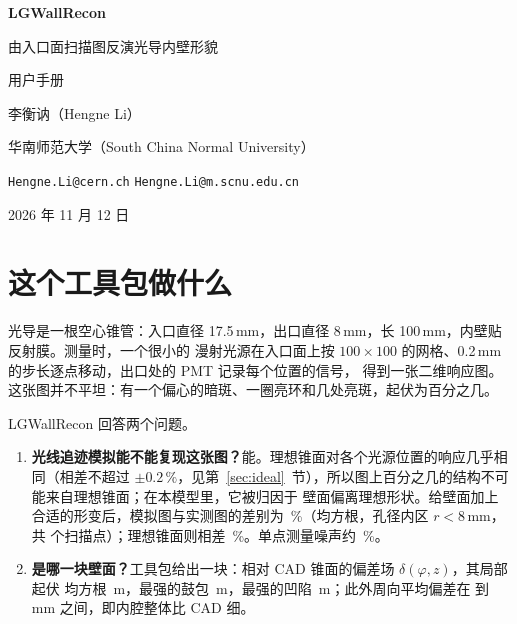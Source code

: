 \documentclass[11pt,a4paper,fontset=fandol]{ctexart}
\newcommand{\um}{\,\textmu m}
\newcommand{\code}[1]{\texttt{#1}}
\begin{document}
\begin{titlepage}
\vspace*{2.5cm}
{\Huge\bfseries LGWallRecon\par}
\vspace{0.5cm}
{\LARGE 由入口面扫描图反演光导内壁形貌\par}
\vspace{0.9cm}
{\Large 用户手册\par}
\vspace{2.2cm}
{\large 李衡讷（Hengne Li）\par}
\vspace{4pt}
华南师范大学（South China Normal University）\par
\vspace{4pt}
\code{Hengne.Li@cern.ch} \quad \code{Hengne.Li@m.scnu.edu.cn}\par
\vspace{1.2cm}
2026 年 11 月 12 日\par
\vfill
{}
\end{titlepage}

\tableofcontents
\newpage

\section{这个工具包做什么}

光导是一根空心锥管：入口直径 17.5\,mm，出口直径 8\,mm，长 100\,mm，内壁贴反射膜。测量时，一个很小的
漫射光源在入口面上按 $100\times100$ 的网格、0.2\,mm 的步长逐点移动，出口处的 PMT 记录每个位置的信号，
得到一张二维响应图。这张图并不平坦：有一个偏心的暗斑、一圈亮环和几处亮斑，起伏为百分之几。

LGWallRecon 回答两个问题。

\begin{enumerate}
\item \textbf{光线追迹模拟能不能复现这张图？}能。理想锥面对各个光源位置的响应几乎相同（相差不超过
$\pm0.2\,\%$，见第~\ref{sec:ideal}~节），所以图上百分之几的结构不可能来自理想锥面；在本模型里，它被归因于
壁面偏离理想形状。给壁面加上合适的形变后，模拟图与实测图的差别为 \RmsFit\,\%（均方根，孔径内区
$r<8$\,mm，共 \Npts{} 个扫描点）；理想锥面则相差 \RmsIdeal\,\%。单点测量噪声约 \NoisePct\,\%。
\item \textbf{是哪一块壁面？}工具包给出一块：相对 CAD 锥面的偏差场 $\delta(\varphi,z)$，其局部起伏
均方根 \LocRms\um，最强的鼓包 \LocMin\um，最强的凹陷 \LocMax\um；此外周向平均偏差在 \MeanMax{} 到 \MeanMin\,mm 之间，即内腔整体比 CAD 细。
\end{enumerate}
\end{document}
